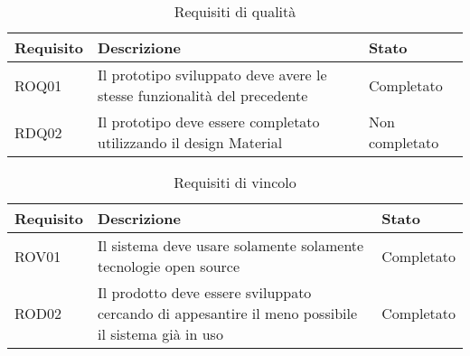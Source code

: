 \begin{table} %
	\centering
	\caption{Requisiti di qualità}
	\label{tab:requisiti-di-qualità}
	\begin{tabular}{|p{5cm}|p{5cm}|p{3cm}|}
		\hline
		Requisito & Descrizione & Stato\\
		\hline
		ROQ01&Il prototipo sviluppato deve avere le stesse funzionalità del precedente&Completato\\
		\hline
		RDQ02&Il prototipo deve essere completato utilizzando il design Material&Non completato\\
		\hline	
	\end{tabular}
\end{table}

\begin{table}
	\centering
	\caption{Requisiti di vincolo}
	\label{tab:requisiti-di-vincolo}
	\begin{tabular}{|p{5cm}|p{5cm}|p{3cm}|}
		\hline
		Requisito & Descrizione & Stato\\
		\hline
		ROV01&Il sistema deve usare solamente solamente tecnologie open source&Completato\\
		\hline
		ROD02&Il prodotto deve essere sviluppato cercando di appesantire il meno possibile il sistema già in uso &Completato\\
		\hline	
	\end{tabular}
\end{table}